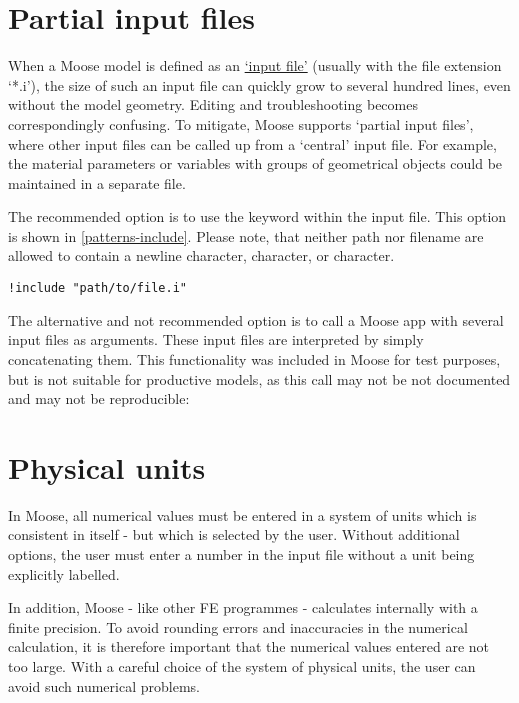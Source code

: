 \section{Partial input files}
\label{chap:patterns-partial-input-files}

When a Moose model is defined as an
\href{https://mooseframework.inl.gov/application_usage/input_syntax.html}{‘input
    file’} (usually with the file extension ‘*.i’), the size of such an input file
can quickly grow to several hundred lines, even without the model geometry.
Editing and troubleshooting becomes correspondingly confusing. To mitigate,
Moose supports ‘partial input files’, where other input files can be called up
from a ‘central’ input file. For example, the material parameters or variables
with groups of geometrical objects could be maintained in a separate file.

The recommended option is to use the  keyword within the
input file. This option is shown in \autoref{patterns-include}. Please note,
that neither path nor filename are allowed to contain a newline character,
\codeword{#} character, or \codeword{[} character.

\begin{lstlisting}[language=Moose, caption={Include another input file},label={patterns-include}]
!include "path/to/file.i"
\end{lstlisting}

The alternative and not recommended option is to call a Moose app with several
input files as arguments. These input files are interpreted by simply
concatenating them. This functionality was included in Moose for test purposes,
but is not suitable for productive models, as this call may not be not
documented and may not be reproducible:


\section{Physical units}
\label{chap:patterns-physical-units}

In Moose, all numerical values must be entered in a system of units which is
consistent in itself - but which is selected by the user. Without additional
options, the user must enter a number in the input file without a unit being
explicitly labelled.

In addition, Moose - like other FE programmes - calculates internally with a
finite precision. To avoid rounding errors and inaccuracies in the numerical
calculation, it is therefore important that the numerical values entered are
not too large. With a careful choice of the system of physical units, the user
can avoid such numerical problems.

